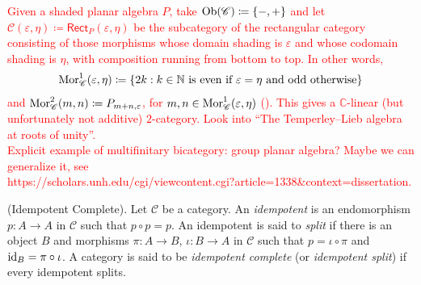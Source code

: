 \noindent\textcolor{red}{Given a shaded planar algebra $P$, take $\textnormal{Ob}(\mathscr{C}) \coloneqq \{-, +\}$ and let $\mathscr{C}(\varepsilon, \eta) \coloneqq \textsf{Rect}_P(\varepsilon, \eta)$ be the subcategory of the rectangular category consisting of those morphisms whose domain shading is $\varepsilon$ and whose codomain shading is $\eta$, with composition running from bottom to top. In other words,
\begin{align*}
\begin{split}
\textnormal{Mor}_\mathscr{C}^1(\varepsilon, \eta) \coloneqq \{2k : \text{$k \in \mathbb{N}$ is even if $\varepsilon = \eta$ and odd otherwise}\}
\end{split}
\end{align*}
\noindent and $\textnormal{Mor}_\mathscr{C}^2(m, n) \coloneqq P_{m+n, \varepsilon}$, for $m, n \in \textnormal{Mor}_\mathscr{C}^1(\varepsilon, \eta)$ (\cite{DGG14}). This gives a $\mathbb{C}$-linear (but unfortunately not additive) $2$-category. Look into ``The Temperley--Lieb algebra at roots of unity''.}\\



\noindent\textcolor{red}{Explicit example of multifinitary bicategory: group planar algebra? Maybe we can generalize it, see\\ https://scholars.unh.edu/cgi/viewcontent.cgi?article=1338\&context=dissertation.}\newpage

\noindent\begin{definition}\textnormal{(Idempotent Complete).} Let $\mathcal{C}$ be a category. An {\em idempotent} is an endomorphism $p : A \to A$ in $\mathcal{C}$ such that $p \circ p = p$. An idempotent is said to {\em split} if there is an object $B$ and morphisms $\pi : A \to B$, $\iota : B \to A$ in $\mathcal{C}$ such that $p = \iota \circ \pi$ and $\textnormal{id}_B = \pi \circ \iota$. A category is said to be {\em idempotent complete} (or {\em idempotent split}) if every idempotent splits.\\
\end{definition}

